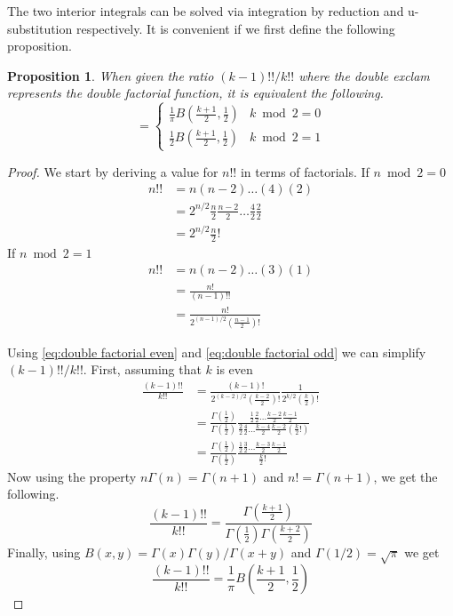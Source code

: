 \documentclass{article}
\newtheorem{proposition}{Proposition}
\begin{document}
The two interior integrals can be solved via integration by reduction and u-substitution respectively. It is convenient if we first define the following proposition.
\begin{proposition} \label{prop:double fac beta}
	When given the ratio $(k-1)!!/k!!$ where the double exclam represents the double factorial function, it is equivalent the following.
	\begin{equation}
		= \begin{cases}
			\frac{1}{\pi}B(\frac{k+1}{2}, \frac{1}{2}) & k\bmod 2=0\\
			\frac{1}{2}B(\frac{k+1}{2}, \frac{1}{2}) & k\bmod 2=1
		\end{cases}
	\end{equation}
\end{proposition}
\begin{proof}
	We start by deriving a value for $n!!$ in terms of factorials. If $n\bmod 2 = 0$
	\begin{align}
		n!! &= n(n-2)\hdots(4)(2) \\
		&= 2^{n/2}\frac{n}{2}\frac{n-2}{2}\hdots\frac{4}{2}\frac{2}{2} \\
		&= 2^{n/2}\frac{n}{2}! \label{eq:double factorial even}
	\end{align}
	If $n\bmod 2= 1$
	\begin{align}
		n!! &= n(n-2)\hdots(3)(1) \\
		&= \frac{n!}{(n-1)!!} \\
		&= \frac{n!}{2^{(n-1)/2}(\frac{n-1}{2})!} \label{eq:double factorial odd}
	\end{align}

	Using \ref{eq:double factorial even} and \ref{eq:double factorial odd} we can simplify $(k-1)!!/k!!$. First, assuming that $k$ is even
	\begin{align}
		\frac{(k-1)!!}{k!!} &= \frac{(k-1)!}{2^{(k-2)/2}(\frac{k-2}{2})!}\frac{1}{2^{k/2}(\frac{k}{2})!} \\
		&= \frac{\Gamma(\frac{1}{2})}{\Gamma(\frac{1}{2})}\frac{\frac{1}{2}\frac{2}{2}\hdots\frac{k-2}{2}\frac{k-1}{2}}{\frac{2}{2}\frac{4}{2}\hdots\frac{k-4}{2}\frac{k-2}{2}(\frac{k}{2}!)} \\
		&= \frac{\Gamma(\frac{1}{2})}{\Gamma(\frac{1}{2})}\frac{\frac{1}{2}\frac{3}{2}\hdots\frac{k-3}{2}\frac{k-1}{2}}{\frac{k}{2}!}
	\end{align}
	Now using the property $n\Gamma(n)=\Gamma(n+1)$ and $n! = \Gamma(n+1)$, we get the following.
	\begin{equation}
		\frac{(k-1)!!}{k!!} = \frac{\Gamma(\frac{k+1}{2})}{\Gamma(\frac{1}{2})\Gamma(\frac{k+2}{2})}
	\end{equation}
	Finally, using $B(x,y)=\Gamma(x)\Gamma(y)/\Gamma(x+y)$ and $\Gamma(1/2) = \sqrt{\pi}$ we get
	\begin{equation}
		\frac{(k-1)!!}{k!!} = \frac{1}{\pi}B\left(\frac{k+1}{2}, \frac{1}{2}\right)
	\end{equation}


\end{proof}
\end{document}
